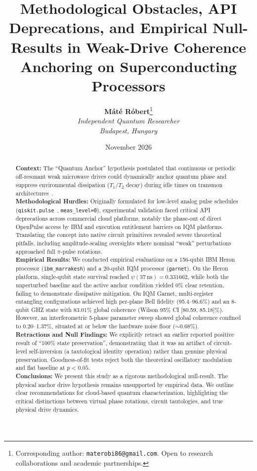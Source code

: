 \documentclass[11pt,a4paper]{article}
\title{\textbf{Methodological Obstacles, API Deprecations, and Empirical Null-Results in Weak-Drive Coherence Anchoring on Superconducting Processors}}
\author{
  \textbf{M\'at\'e R\'obert}\thanks{Corresponding author: \texttt{materobi86@gmail.com}. Open to research collaborations and academic partnerships.}\\
  \textit{Independent Quantum Researcher}\\
  \textit{Budapest, Hungary}
}
\date{November 2026}
\begin{document}
\maketitle

\begin{abstract}
\noindent \textbf{Context:} The ``Quantum Anchor'' hypothesis postulated that continuous or periodic off-resonant weak microwave drives could dynamically anchor quantum phase and suppress environmental dissipation ($T_1$/$T_2$ decay) during idle times on transmon architectures~\cite{transmon_coherence,dynamical_decoupling}. \\
\textbf{Methodological Hurdles:} Originally formulated for low-level analog pulse schedules (\texttt{qiskit.pulse}~\cite{qiskit_pulse}, \texttt{meas\_level=0}), experimental validation faced critical API deprecations across commercial cloud platforms, notably the phase-out of direct OpenPulse access by IBM and execution entitlement barriers on IQM platforms. Translating the concept into native circuit primitives revealed severe theoretical pitfalls, including amplitude-scaling oversights where nominal ``weak'' perturbations approached full $\pi$-pulse rotations. \\
\textbf{Empirical Results:} We conducted empirical evaluations on a 156-qubit IBM Heron processor (\texttt{ibm\_marrakesh}) and a 20-qubit IQM processor (\texttt{garnet}). On the Heron platform, single-qubit state survival reached $\psi(37\,\text{ns}) = 0.331662$, while both the unperturbed baseline and the active anchor condition yielded 0\% clear retention, failing to demonstrate dissipative mitigation. On IQM Garnet, multi-register entangling configurations achieved high per-plane Bell fidelity (95.4--96.6\%) and an 8-qubit GHZ state with 83.01\% global coherence (Wilson 95\% CI [80.59, 85.18]\%). However, an interferometric 5-phase parameter sweep showed global coherence confined to 0.20--1.37\%, situated at or below the hardware noise floor ($\sim 0.68\%$). \\
\textbf{Retractions and Null Findings:} We explicitly retract an earlier reported positive result of ``100\% state preservation'', demonstrating that it was an artifact of circuit-level self-inversion (a tautological identity operation) rather than genuine physical preservation. Goodness-of-fit tests reject both the theoretical oscillatory modulation and flat baseline at $p < 0.05$. \\
\textbf{Conclusions:} We present this study as a rigorous methodological null-result. The physical anchor drive hypothesis remains unsupported by empirical data. We outline clear recommendations for cloud-based quantum characterization, highlighting the critical distinctions between virtual phase rotations, circuit tautologies, and true physical drive dynamics.
\end{abstract}
\end{document}
